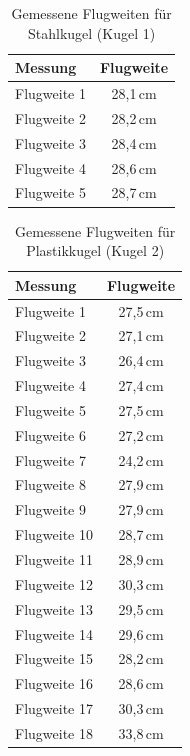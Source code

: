 \documentclass{article}
\begin{document}
\begin{table}[h]
    \centering
    \caption{Gemessene Flugweiten für Stahlkugel (Kugel 1)}
    \vspace{.2cm}
    \label{tab:flugweiten1}
    \begin{tabular}{lc}
        \toprule
        \textbf{Messung} & \textbf{Flugweite} \\
        \midrule
        Flugweite 1 & 28{,}1\,cm \\
        Flugweite 2 & 28{,}2\,cm \\
        Flugweite 3 & 28{,}4\,cm \\
        Flugweite 4 & 28{,}6\,cm \\
        Flugweite 5 & 28{,}7\,cm \\
        \bottomrule
    \end{tabular}
\end{table}

\begin{table}[h]
    \centering
    \caption{Gemessene Flugweiten für Plastikkugel (Kugel 2)}
    \vspace{.2cm}
    \label{tab:flugweiten2}
    \begin{tabular}{lc}
        \toprule
        \textbf{Messung} & \textbf{Flugweite} \\
        \midrule
        Flugweite 1  & 27{,}5\,cm \\
        Flugweite 2  & 27{,}1\,cm \\
        Flugweite 3  & 26{,}4\,cm \\
        Flugweite 4  & 27{,}4\,cm \\
        Flugweite 5  & 27{,}5\,cm \\
        Flugweite 6  & 27{,}2\,cm \\
        Flugweite 7  & 24{,}2\,cm \\
        Flugweite 8  & 27{,}9\,cm \\
        Flugweite 9  & 27{,}9\,cm \\
        Flugweite 10 & 28{,}7\,cm \\
        Flugweite 11 & 28{,}9\,cm \\
        Flugweite 12 & 30{,}3\,cm \\
        Flugweite 13 & 29{,}5\,cm \\
        Flugweite 14 & 29{,}6\,cm \\
        Flugweite 15 & 28{,}2\,cm \\
        Flugweite 16 & 28{,}6\,cm \\
        Flugweite 17 & 30{,}3\,cm \\
        Flugweite 18 & 33{,}8\,cm \\
        \bottomrule
    \end{tabular}
\end{table}
\end{document}
